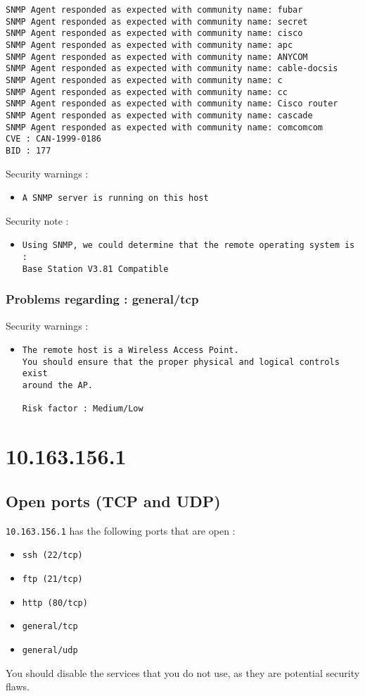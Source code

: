 \documentclass{article}
\begin{document}
\begin{itemize}
\begin{verbatim}
SNMP Agent responded as expected with community name: fubar
SNMP Agent responded as expected with community name: secret
SNMP Agent responded as expected with community name: cisco
SNMP Agent responded as expected with community name: apc
SNMP Agent responded as expected with community name: ANYCOM
SNMP Agent responded as expected with community name: cable-docsis
SNMP Agent responded as expected with community name: c
SNMP Agent responded as expected with community name: cc
SNMP Agent responded as expected with community name: Cisco router
SNMP Agent responded as expected with community name: cascade
SNMP Agent responded as expected with community name: comcomcom
CVE : CAN-1999-0186
BID : 177
\end{verbatim}\end{itemize}
Security warnings :\\
\begin{itemize}
\item \begin{verbatim}
A SNMP server is running on this host
\end{verbatim}\end{itemize}
Security note :\\
\begin{itemize}
\item \begin{verbatim}
Using SNMP, we could determine that the remote operating system is :
Base Station V3.81 Compatible
\end{verbatim}\end{itemize}
\subsubsection{Problems regarding : general/tcp}
Security warnings :\\
\begin{itemize}
\item \begin{verbatim}
The remote host is a Wireless Access Point.
You should ensure that the proper physical and logical controls exist
around the AP.

Risk factor : Medium/Low
\end{verbatim}\end{itemize}
\newpage
\section{10.163.156.1}
\subsection{Open ports (TCP and UDP)}
\verb+10.163.156.1+ has the following ports that are open : 
\begin{itemize}
\item\verb+ssh (22/tcp)+
\item\verb+ftp (21/tcp)+
\item\verb+http (80/tcp)+
\item\verb+general/tcp+
\item\verb+general/udp+
\end{itemize}
You should disable the services that you do not use, as they are potential security flaws.
\end{document}
